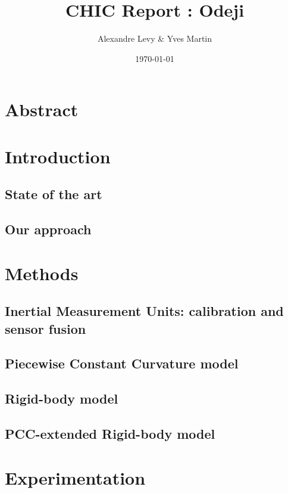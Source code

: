 \documentclass[12pt]{article}
\title{CHIC Report : Odeji}			%
\author{Alexandre Levy & Yves Martin}					%
\date{\today}											%
\begin{document}

\renewcommand*\contentsname{Table of contents}
\tableofcontents
\newpage

\section{Abstract}


\section{Introduction}
\subsection{State of the art}

\subsection{Our approach}


\section{Methods}
\subsection{Inertial Measurement Units: calibration and sensor fusion}

\subsection{Piecewise Constant Curvature model}

\subsection{Rigid-body model}

\subsection{PCC-extended Rigid-body model}


\section{Experimentation}
\end{document}
